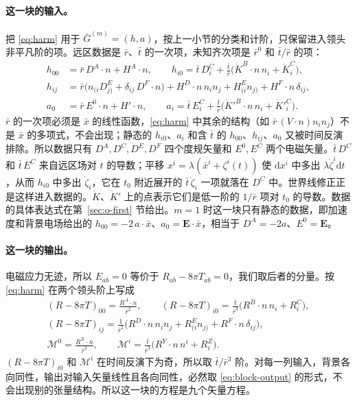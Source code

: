 \documentclass[11pt,a4paper]{ctexart}
\newcommand{\dd}{\mathrm d}
\newcommand{\M}{\mathcal M}
\begin{document}
\paragraph{这一块的输入。}把 \eqref{eq:harm} 用于 $\bar G^{(m)}=(h,a)$，按上一小节的分类和计阶，只保留进入领头非平凡阶的项。远区数据是 $\bar r$、$\bar t$ 的一次项，未知齐次项是 $\bar r^0$ 和 $\bar t/\bar r$ 的项：
\begin{equation}
\begin{aligned}
h_{00}&=\bar r\,D^A\!\cdot n+H^A\!\cdot n,\qquad
h_{i0}=\bar t\,D^C_i+\frac{\bar t}{\bar r}\big(\dot K^B\!\cdot n\,n_i+\dot K^C_i\big),\\
h_{ij}&=\bar r\big(n_{(i}D^E_{j)}+\delta_{ij}\,D^F\!\cdot n\big)+H^D\!\cdot n\,n_in_j+H^E_{(i}n_{j)}+H^F\!\cdot n\,\delta_{ij},\\
a_0&=\bar r\,E^0\!\cdot n+H'\!\cdot n,\qquad
a_i=\bar t\,E^C_i+\frac{\bar t}{\bar r}\big(\dot K'^B\!\cdot n\,n_i+\dot K'^C_i\big).
\end{aligned}
\label{eq:block-input}
\end{equation}
$\bar r$ 的一次项必须是 $\bar x$ 的线性函数，\eqref{eq:harm} 中其余的结构（如 $\bar r\,(V\!\cdot n)n_in_j$）不是 $\bar x$ 的多项式，不会出现；静态的 $h_{i0}$、$a_i$ 和含 $\bar t$ 的 $h_{00}$、$h_{ij}$、$a_0$ 又被时间反演排除。所以数据只有 $D^A,D^C,D^E,D^F$ 四个度规矢量和 $E^0,E^C$ 两个电磁矢量。$\bar t\,D^C$ 和 $\bar t\,E^C$ 来自远区场对 $t$ 的导数；平移 $x^i=\lambda(\bar x^i+\zeta^i(t))$ 使 $\dd x^i$ 中多出 $\lambda\dot\zeta^i\dd t$，从而 $h_{i0}$ 中多出 $\dot\zeta_i$，它在 $t_0$ 附近展开的 $\bar t\,\ddot\zeta_i$ 一项就落在 $D^C$ 中。世界线修正正是这样进入数据的。$\dot K$、$\dot K'$ 上的点表示它们是低一阶的 $1/\bar r$ 项对 $t_0$ 的导数。数据的具体表达式在第~\ref{sec:o-first} 节给出。$m=1$ 时这一块只有静态的数据，即加速度和背景电场给出的 $h_{00}=-2\,a\cdot\bar x$、$a_0=\boldsymbol E\cdot\bar x$，相当于 $D^A=-2a$、$E^0=\boldsymbol E$。

\paragraph{这一块的输出。}电磁应力无迹，所以 $E_{ab}=0$ 等价于 $R_{ab}-8\pi T_{ab}=0$，我们取后者的分量。按 \eqref{eq:harm} 在两个领头阶上写成
\begin{equation}
\begin{gathered}
(R-8\pi T)_{00}=\frac{R^A\!\cdot n}{\bar r^2},\qquad
(R-8\pi T)_{i0}=\frac{\bar t}{\bar r^3}\big(R^B\!\cdot n\,n_i+R^C_i\big),\\
(R-8\pi T)_{ij}=\frac1{\bar r^2}\big(R^D\!\cdot n\,n_in_j+R^E_{(i}n_{j)}+R^F\!\cdot n\,\delta_{ij}\big),\\
\M^0=\frac{R^X\!\cdot n}{\bar r^2},\qquad
\M^i=\frac{\bar t}{\bar r^3}\big(R^Y\!\cdot n\,n^i+R^Z_i\big).
\end{gathered}
\label{eq:block-output}
\end{equation}
$(R-8\pi T)_{i0}$ 和 $\M^i$ 在时间反演下为奇，所以取 $\bar t/\bar r^3$ 阶。对每一列输入，背景各向同性，输出对输入矢量线性且各向同性，必然取 \eqref{eq:block-output} 的形式，不会出现别的张量结构。所以这一块的方程是九个矢量方程。
\end{document}
